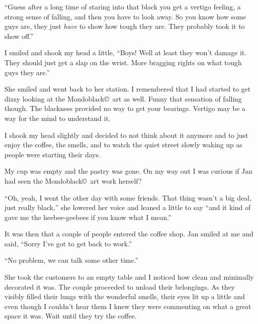 ``Guess after a long time of staring into that black you get a vertigo
feeling, a strong sense of falling, and then you have to look
away. So you know how some guys are, they just \emph{have} to
show how tough they are. They probably took it to show off.''

I smiled and shook my head a little, ``Boys! Well at least they
won't damage it. They should just get a slap on the wrist. More
bragging rights on what tough guys they are.''

She smiled and went back to her station. I remembered that I had
started to get dizzy looking at the Mondoblack\copyright\ art as
well. Funny that sensation of falling though. The blackness
provided no way to get your bearings. Vertigo may be a way for
the mind to understand it.

I shook my head slightly and decided to not think about it anymore
and to just enjoy the coffee, the smells, and to watch the quiet
street slowly waking up as people were starting their days.

My cup was empty and the pastry was gone.  On my way out I
was curious if Jan had seen the Mondoblack\copyright\ art work
herself?

``Oh, yeah, I went the other day with some
friends. That thing wasn't a big deal, just really
black,'' she lowered her voice and leaned a little to say ``and
it kind of gave me the heebee-geebees if you know what I mean.''

It was then that a couple of people entered the coffee shop. Jan
smiled at me and said, ``Sorry I've got to get back to work.''

``No problem, we can talk some other time.''

She took the customers to an empty table and I noticed how clean
and minimally decorated it was. The couple proceeded to
unload their belongings.  As they visibly filled their lungs
with the wonderful smells, their eyes lit up a little and even
though I couldn't hear them I knew they were commenting on what
a great space it was. Wait until they try the coffee.

\section{}

